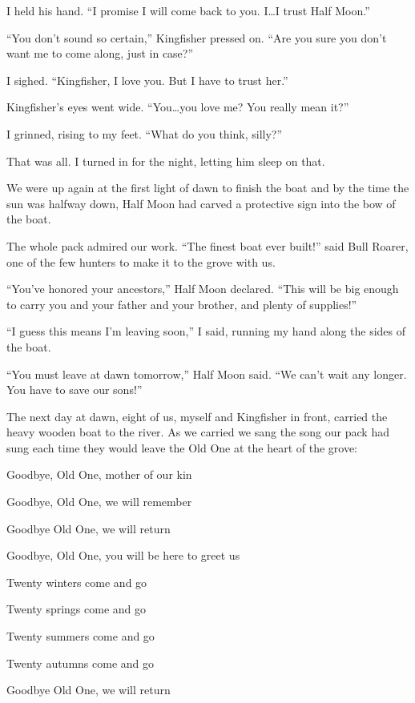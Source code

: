 I held his hand. ``I promise I will come back to you. I\ldots{}I trust Half Moon.''

``You don't sound so certain,'' Kingfisher pressed on. ``Are you sure you don't want me to come along, just in case?''

I sighed. ``Kingfisher, I love you. But I have to trust her.''

Kingfisher's eyes went wide. ``You\ldots{}you love me? You really mean it?''

I grinned, rising to my feet. ``What do you think, silly?''

That was all. I turned in for the night, letting him sleep on that.

\secdiv

\noindent We were up again at the first light of dawn to finish the boat and by the time the sun was halfway down, Half Moon had carved a protective sign into the bow of the boat.

The whole pack admired our work. ``The finest boat ever built!'' said Bull Roarer, one of the few hunters to make it to the grove with us.

``You've honored your ancestors,'' Half Moon declared. ``This will be big enough to carry you and your father and your brother, and plenty of supplies!''

``I guess this means I'm leaving soon,'' I said, running my hand along the sides of the boat.

``You must leave at dawn tomorrow,'' Half Moon said. ``We can't wait any longer. You have to save our sons!''

\secdiv

\noindent The next day at dawn, eight of us, myself and Kingfisher in front, carried the heavy wooden boat to the river. As we carried we sang the song our pack had sung each time they would leave the Old One at the heart of the grove:

Goodbye, Old One, mother of our kin

Goodbye, Old One, we will remember

Goodbye Old One, we will return

Goodbye, Old One, you will be here to greet us

Twenty winters come and go

Twenty springs come and go

Twenty summers come and go

Twenty autumns come and go

Goodbye Old One, we will return

